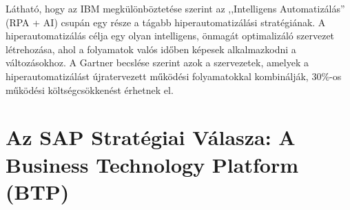 Látható, hogy az IBM \cite{IBM-IRPA-vs-Hyperautomation} megkülönböztetése szerint az ,,Intelligens Automatizálás'' (RPA + AI) csupán egy része a tágabb hiperautomatizálási stratégiának.
A hiperautomatizálás célja egy olyan intelligens, önmagát optimalizáló szervezet létrehozása, ahol a folyamatok valós időben képesek alkalmazkodni a változásokhoz.
A Gartner becslése szerint azok a szervezetek, amelyek a hiperautomatizálást újratervezett működési folyamatokkal kombinálják, 30\%-os működési költségcsökkenést érhetnek el\cite{Kissflow-Hyperautomation}.


\section{Az SAP Stratégiai Válasza: A Business Technology Platform (BTP)}
\label{sec:btp}

